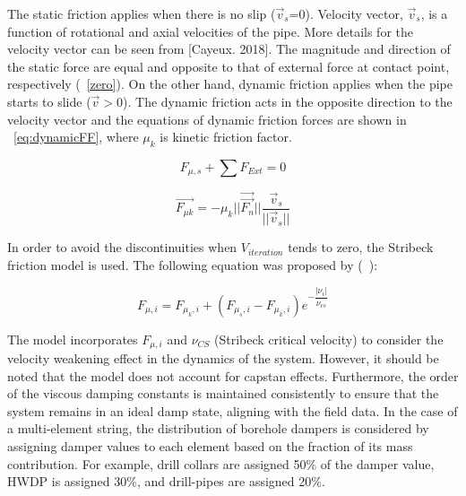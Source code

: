 \textcolor[rgb]{0.00,0.07,1.00}{The static friction applies when there is no slip ($\vec{v}_s$=0). Velocity vector, $\vec{v}_s$, is a function of rotational and axial velocities of the pipe. More details for the velocity vector can be seen from [Cayeux. 2018]. The magnitude and direction of the static force are equal and opposite to that of external force at contact point, respectively (\equationname~\ref{zero}). On the other hand, dynamic friction applies when the pipe starts to slide ($\vec{v} > 0$). The dynamic friction acts in the opposite direction to the velocity vector and the equations of dynamic friction forces are shown in \equationname~\ref{eq:dynamicFF}, where $\mu_k$ is kinetic friction factor.}

\begin{equation}\label{zero}
  F_{\mu,s} + \sum F_{Ext} = 0
\end{equation}

\begin{equation}\label{eq:dynamicFF}
  \vec{F_{\mu k}} = -\mu_k ||\vec{\vec{F_n}}||\frac{\vec{v}_s}{{||\vec{v}_s}||}
\end{equation}


In order to avoid the discontinuities when $V_{iteration}$ tends to zero, the Stribeck friction model is used. The following equation was proposed by (~\cite{ref:tustin1947a}):

\begin{equation}\label{Stribeck velocity}
  F_{\mu,i} = F_{\mu_{k},i} + (F_{\mu_{s},i} - F_{\mu_{k},i})e^{-\dfrac{|\nu_{i}|}{\nu_{cs}}}
\end{equation}

The model incorporates $F_{\mu,i}$ and $\nu_{CS}$ (Stribeck critical velocity) to consider the velocity weakening effect in the dynamics of the system. However, it should be noted that the model does not account for capstan effects. Furthermore, the order of the viscous damping constants is maintained consistently to ensure that the system remains in an ideal damp state, aligning with the field data. In the case of a multi-element string, the distribution of borehole dampers is considered by assigning damper values to each element based on the fraction of its mass contribution. For example, drill collars are assigned 50\% of the damper value, HWDP is assigned 30\%, and drill-pipes are assigned 20\%.

